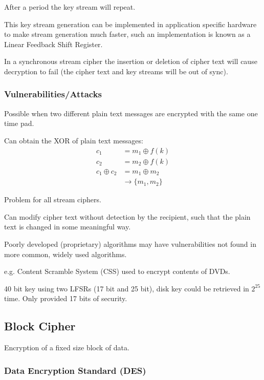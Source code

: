 \documentclass[a4paper]{article}
\begin{document}
After a period the key stream will repeat.

This key stream generation can be implemented in application specific hardware
to make stream generation much faster, such an implementation is known as a
Linear Feedback Shift Register.

In a synchronous stream cipher the insertion or deletion of cipher text will
cause decryption to fail (the cipher text and key streams will be out of sync).

\subsubsection{Vulnerabilities/Attacks}


Possible when two different plain text messages are encrypted with the same one
time pad.

Can obtain the XOR of plain text messages:
\begin{align*}
               c_{1} &= m_{1} \oplus f(k) \\
               c_{2} &= m_{2} \oplus f(k) \\
  c_{1} \oplus c_{2} &= m_{1} \oplus m_{2} \\
                     &\rightarrow \{m_{1}, m_{2}\}
\end{align*}


Problem for all stream ciphers.

Can modify cipher text without detection by the recipient, such that the plain
text is changed in some meaningful way.


Poorly developed (proprietary) algorithms may have vulnerabilities not found in
more common, widely used algorithms.

e.g. Content Scramble System (CSS) used to encrypt contents of DVDs.

40 bit key using two LFSRs (17 bit and 25 bit), disk key could be retrieved in
$2^{25}$ time. Only provided 17 bits of security.

\subsection{Block Cipher}

Encryption of a fixed size block of data.

\subsubsection{Data Encryption Standard (DES)}
\end{document}
